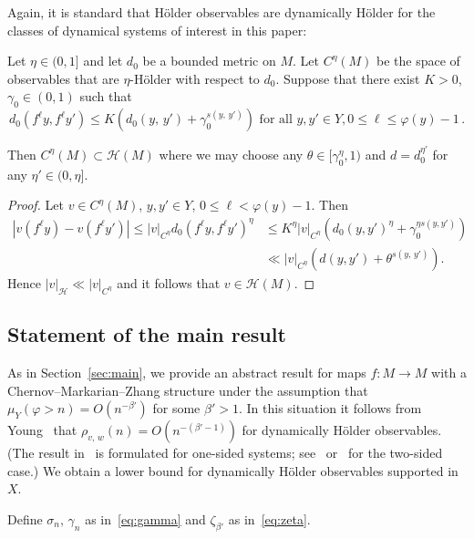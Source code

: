 \documentclass[10pt]{amsart}
\theoremstyle{definition}\newtheorem{defi}[theo]{Definition}\newtheorem{rema}[theo]{Remark}\newtheorem{exam}[theo]{Example}\newtheorem{exem}[theo]{Example}\newtheorem{nota}[theo]{Notation}
\newcommand{\cH}{\mathcal{H}}
\begin{document}
Again, it is standard that H\"older observables are dynamically H\"older for the classes of dynamical systems of interest in this paper:

\begin{prop}\label{prop:dyn2}
Let $\eta\in(0,1]$ and let $d_0$ be a bounded metric on $M$. Let $C^\eta(M)$ be the space of observables that are $\eta$-H\"older with respect to $d_0$. Suppose that there exist $K>0$, $\gamma_0\in(0,1)$ such that
\[
d_0\left(f^\ell y,f^\ell y'\right)\le K\left(d_0(y,\,y')+\gamma_0^{s(y,\,y')}\right)\text{ for all }y,y'\in Y, 0\le\ell\le \varphi(y)-1\,.
\]

Then $C^\eta(M)\subset \cH(M)$ where we may choose any $\theta\in[\gamma_0^\eta,1)$ and $d=d_0^{\eta'}$ for any $\eta'\in(0,\eta]$.
\end{prop}

\begin{proof}
Let $v\in C^\eta(M)$, $y,y'\in Y$, $0\le\ell<\varphi(y)-1$. Then
\begin{align*}
\left|v\left(f^\ell y\right)- v\left(f^\ell y'\right)\right|
\le {|v|}_{C^\eta}d_0\left(f^\ell y,f^\ell y'\right)^\eta & \le K^\eta {|v|}_{C^\eta} \left(d_0(y,y')^\eta+\gamma_0^{\eta s(y,y')}\right)
\\ & \ll {|v|}_{C^\eta} \left(d(y,y')+\theta^{s(y,\,y')}\right).
\end{align*}
Hence ${|v|}_{\cH}\ll {|v|}_{C^\eta}$ and it follows that $v\in \cH(M)$.
\end{proof}

\subsection{Statement of the main result}\label{sec:state2}

As in Section~\ref{sec:main}, we provide an abstract result for maps $f:M\to M$ with a Chernov--Markarian--Zhang structure under the assumption that $\mu_Y(\varphi>n)=O(n^{-\beta'})$ for some $\beta'>1$. In this situation it follows from Young~\cite{Young99} that $\rho_{v,\,w}(n)=O(n^{-(\beta'-1)})$ for dynamically H\"older observables. (The result in~\cite{Young99} is formulated for one-sided systems; see~\cite[Theorem~2.10]{KKM19} or~\cite[Appendix~B]{MT14} for the two-sided case.) We obtain a lower bound for dynamically H\"older observables supported in $X$.

Define $\sigma_n,\,\gamma_n$ as in~\eqref{eq:gamma} and $\zeta_{\beta'}$ as in~\eqref{eq:zeta}.
\end{document}
